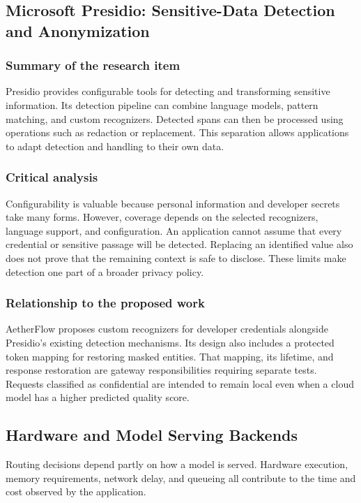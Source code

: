 \subsection{Microsoft Presidio: Sensitive-Data Detection and Anonymization}
\subsubsection{Summary of the research item}
Presidio \cite{ref:Presidio} provides configurable tools for detecting and transforming sensitive information. Its detection pipeline can combine language models, pattern matching, and custom recognizers. Detected spans can then be processed using operations such as redaction or replacement. This separation allows applications to adapt detection and handling to their own data.

\subsubsection{Critical analysis}
Configurability is valuable because personal information and developer secrets take many forms. However, coverage depends on the selected recognizers, language support, and configuration. An application cannot assume that every credential or sensitive passage will be detected. Replacing an identified value also does not prove that the remaining context is safe to disclose. These limits make detection one part of a broader privacy policy.

\subsubsection{Relationship to the proposed work}
AetherFlow proposes custom recognizers for developer credentials alongside Presidio's existing detection mechanisms. Its design also includes a protected token mapping for restoring masked entities. That mapping, its lifetime, and response restoration are gateway responsibilities requiring separate tests. Requests classified as confidential are intended to remain local even when a cloud model has a higher predicted quality score.

\subsection*{Hardware and Model Serving Backends}

Routing decisions depend partly on how a model is served. Hardware execution, memory requirements, network delay, and queueing all contribute to the time and cost observed by the application.

